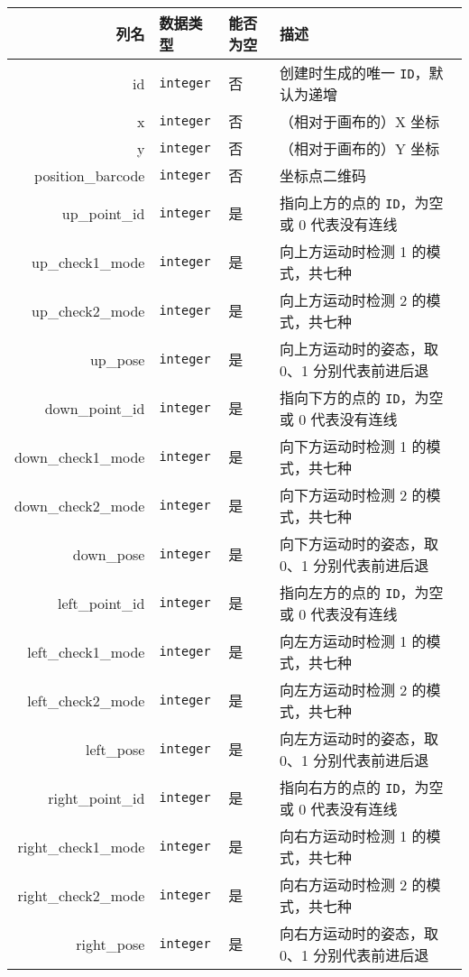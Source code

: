 \begin{longtabu}to \textwidth{rllX}
  \toprule
  列名 & 数据类型 & 能否为空 & 描述 \\
  \midrule
  \endhead
  \bottomrule
  \endfoot
  id & \texttt{integer} & 否 & 创建时生成的唯一 \texttt{ID}，默认为递增 \\
  x & \texttt{integer} & 否 & （相对于画布的）X 坐标 \\
  y & \texttt{integer} & 否 & （相对于画布的）Y 坐标 \\
  position\_barcode & \texttt{integer} & 否 & 坐标点二维码 \\
  up\_point\_id & \texttt{integer} & 是 & 指向上方的点的 \texttt{ID}，为空或 0 代表没有连线 \\
  up\_check1\_mode & \texttt{integer} & 是 & 向上方运动时检测 1 的模式，共七种 \\
  up\_check2\_mode & \texttt{integer} & 是 & 向上方运动时检测 2 的模式，共七种 \\
  up\_pose & \texttt{integer} & 是 & 向上方运动时的姿态，取 0、1 分别代表前进后退 \\
  down\_point\_id & \texttt{integer} & 是 & 指向下方的点的 \texttt{ID}，为空或 0 代表没有连线 \\
  down\_check1\_mode & \texttt{integer} & 是 & 向下方运动时检测 1 的模式，共七种 \\
  down\_check2\_mode & \texttt{integer} & 是 & 向下方运动时检测 2 的模式，共七种 \\
  down\_pose & \texttt{integer} & 是 & 向下方运动时的姿态，取 0、1 分别代表前进后退 \\
  left\_point\_id & \texttt{integer} & 是 & 指向左方的点的 \texttt{ID}，为空或 0 代表没有连线 \\
  left\_check1\_mode & \texttt{integer} & 是 & 向左方运动时检测 1 的模式，共七种 \\
  left\_check2\_mode & \texttt{integer} & 是 & 向左方运动时检测 2 的模式，共七种 \\
  left\_pose & \texttt{integer} & 是 & 向左方运动时的姿态，取 0、1 分别代表前进后退 \\
  right\_point\_id & \texttt{integer} & 是 & 指向右方的点的 \texttt{ID}，为空或 0 代表没有连线 \\
  right\_check1\_mode & \texttt{integer} & 是 & 向右方运动时检测 1 的模式，共七种 \\
  right\_check2\_mode & \texttt{integer} & 是 & 向右方运动时检测 2 的模式，共七种 \\
  right\_pose & \texttt{integer} & 是 & 向右方运动时的姿态，取 0、1 分别代表前进后退
\end{longtabu}

